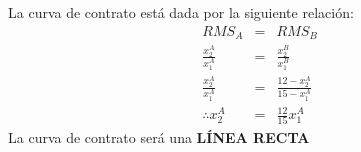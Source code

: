 La curva de contrato está dada por la siguiente relación:
	\begin{eqnarray*}
		RMS_{A} & = & RMS_{B}\\[0.3cm]
		\frac{x_{2}^{A}}{x_{1}^{A}} & = & \frac{x_{2}^{B}}{x_{1}^{B}}\\[0.3cm]
		\frac{x_{2}^{A}}{x_{1}^{A}} & = & \frac{12 - x_{2}^{A}}{15 - x_{1}^{A}}\\[0.3cm]
		\therefore x_{2}^{A} & = & \frac{12}{15}x_{1}^{A}
	\end{eqnarray*}
La curva de contrato será una \textbf{LÍNEA RECTA}